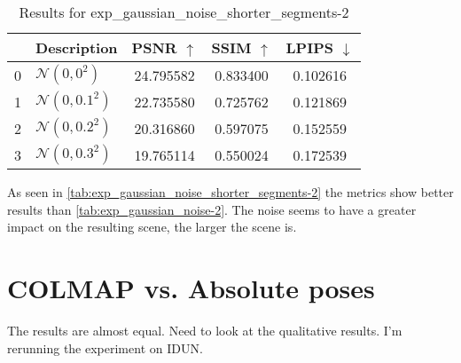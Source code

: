 \begin{table}[ht]
\centering
\setlength{\tabcolsep}{6pt}
\renewcommand{\arraystretch}{1.5}
\begin{tabular}{l l | C{2.2} C{1.3} C{1.3}}
\hline
& \textbf{Description} & \textbf{PSNR $\uparrow$} & \textbf{SSIM $\uparrow$} & \textbf{LPIPS $\downarrow$} \\
 & $\mathcal{N}(0, 0^2)$ &  24.795582 &  0.833400 &  0.102616 \\
1 & $\mathcal{N}(0, 0.1^2)$ & 22.735580 & 0.725762 & 0.121869 \\
2 & $\mathcal{N}(0, 0.2^2)$ & 20.316860 & 0.597075 & 0.152559 \\
3 & $\mathcal{N}(0, 0.3^2)$ &  19.765114 &  0.550024 &  0.172539 \\
\bottomrule
\end{tabular}
\caption{Results for exp\_gaussian\_noise\_shorter\_segments-2}
\label{tab:exp_gaussian_noise_shorter_segments-2}
\end{table}



As seen in \autoref{tab:exp_gaussian_noise_shorter_segments-2} the metrics show better results than \autoref{tab:exp_gaussian_noise-2}. The noise seems to have a greater impact on the resulting scene, the larger the scene is. 


















\section{COLMAP vs. Absolute poses}

The results are almost equal. Need to look at the qualitative results. I'm rerunning the experiment on IDUN.

\begin{comment}   
{
  "experiment_name": "exp_combined_baseline_2_colmap_REDONE-0",
  "method_name": "nerfacto",
  "checkpoint": "data/images/exp_combined_baseline_2_colmap_REDONE/0/exp_combined_baseline_2_colmap_REDONE-0/nerfacto/2023-05-15_142558/nerfstudio_models/step-000014999.ckpt",
  "results": {
    "psnr": 23.396726608276367,
    "ssim": 0.7092073559761047,
    "lpips": 0.32087942957878113,
    "num_rays_per_sec": 741178.5625,
    "fps": 6.176488876342773
  }
}
\end{comment}



